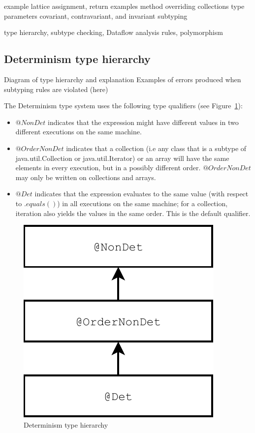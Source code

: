 example lattice
assignment, return examples
method overriding
collections type parameters
covariant, contravariant, and invariant subtyping

type hierarchy, subtype checking, Dataflow analysis rules, polymorphism

\subsection{Determinism type hierarchy}
Diagram of type hierarchy and explanation
Examples of errors produced when subtyping rules are violated (here)

The Determinism type system uses the following type qualifiers (see Figure~\ref{fig-determinism-hierarchy}):
\begin{itemize}
	\item $@NonDet$ indicates
	that the expression might have different values in two different executions on the same machine.
	\item $@OrderNonDet$ indicates that
	a collection (i.e any class that is a subtype of java.util.Collection or java.util.Iterator) or an array will have the same elements in every execution, but in a
	possibly different order.  $@OrderNonDet$ may only be written on
	collections and arrays.
	\item $@Det$ indicates that
	the expression evaluates to the same value (with respect to $.equals()$) in all
	executions on the same machine; for a collection, iteration also yields the values in the same
	order.
	This is the default qualifier.
\end{itemize}

\begin{figure}
	\begin{center}
		\includegraphics[scale=0.5]{determinism}
	\end{center}
	\caption{Determinism type hierarchy}
	\label{fig-determinism-hierarchy}
\end{figure}

